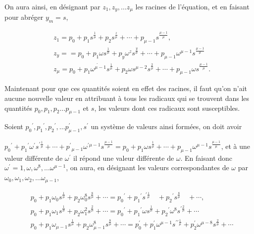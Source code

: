 \documentclass{article}
\begin{document}
On aura ainsi, en désignant par \(z_{1}, z_{y}, \ldots z_{\mu}\) les racines de l'équation, et en faisant pour abréger \(y_{m}=s\),

\[
\begin{aligned}
& z_{1}=p_{0}+p_{1} s^{\frac{1}{\mu}}+p_{2} s^{\frac{z}{\mu}}+\cdots+p_{\mu-1} s^{\frac{\mu-1}{\mu}}, \\
& z_{y}==p_{0}+p_{1} \omega s^{\frac{1}{\mu}}+p_{y} \omega^{z} s^{\frac{y}{\mu}}+\cdots+p_{\mu-1} \omega^{\mu-1} s^{\frac{\mu-1}{\mu}} \\
& z_{\mu}=p_{0}+p_{1} \dot{\omega^{\mu-1}} s^{\frac{1}{\mu}}+p_{2} \omega s^{\mu-2} s^{\frac{2}{\mu}}+\cdots+p_{\mu-1} \omega s^{\frac{\mu-1}{\mu}} .
\end{aligned}
\]

Maintenant pour que ces quantités soient en effet des racines, il faut qu'on n'ait aucune nouvelle valeur en attribuant à tous les radicaux qui se trouvent dans les quantités \(p_{0}, p_{1}, p_{2} \ldots p_{\mu-1}\) et \(s\), les valeurs dont ces radicaux sont susceptibles.

Soient \(p_{0}{ }^{\prime}, p_{1}{ }^{\prime}, p_{2}{ }^{\prime}, \ldots p_{\mu-1}^{\prime}, s^{\prime}\) un système de valeurs ainsi formées, on doit avoir

\(p_{0}{ }^{\prime}+p_{1}{ }^{\prime} \omega^{\prime} s^{\prime \frac{1}{\mu}}+\cdots+p^{\prime}{ }_{\mu-1} \omega^{\prime \mu-1} s^{\frac{\mu-1}{\mu}}=p_{0}+p_{1} \omega s^{\frac{1}{\mu}}+\cdots+p_{\mu-1} \omega^{\mu-1} s^{\frac{\mu-1}{\mu}}\), et à une valeur différente de \(\omega^{\prime}\) il répond une valeur différente de \(\omega\). En faisant donc \(\omega^{\prime}=1, \omega, \omega^{8}, \ldots \omega^{\mu-1}\), on aura, en désignant les valeurs correspondantes de \(\omega\) par \(\omega_{0}, \omega_{1}, \omega_{2}, \ldots \omega_{\mu-1}\),

\[
\begin{aligned}
& p_{0}+p_{1} \omega_{0} s^{\frac{1}{\mu}}+p_{2} \omega_{0}^{8} s^{\frac{8}{\mu}}+\cdots=p_{0}{ }^{\prime}+p_{1}{ }^{\prime} s^{\prime \frac{1}{\mu}} \quad+p_{2}{ }^{\prime} s^{\frac{8}{\mu}} \quad+\cdots, \\
& p_{0}+p_{1} \omega_{1} s^{\frac{1}{\mu}}+p_{2} \omega_{1}^{2} s^{\frac{2}{\mu}}+\cdots=p_{0}{ }^{\prime}+p_{1}{ }^{\prime} \omega s^{\frac{1}{\mu}}+p_{2}{ }^{\prime} \omega^{8} s^{\prime \frac{2}{\mu}}+\cdots \\
& p_{0}+p_{1} \omega_{\mu-1} s^{\frac{1}{\mu}}+p_{2} \omega_{\mu-1}^{8} s^{\frac{8}{\mu}}+\cdots=p_{0}^{\prime}+p_{1}^{\prime} \omega^{\mu-1} s^{\prime \prime \frac{1}{\mu}}+p_{2}^{\prime} \omega^{\mu-8} s^{\frac{2}{\mu}}+\cdots
\end{aligned}
\]
\end{document}
